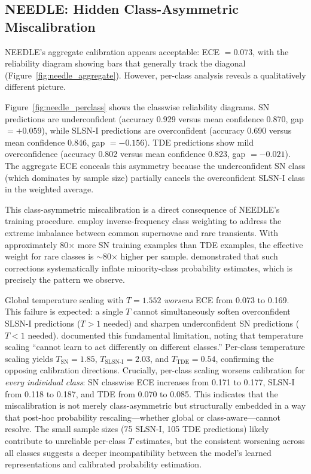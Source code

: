 \documentclass[twocolumn]{aastex631}
\begin{document}
\subsection{NEEDLE: Hidden Class-Asymmetric Miscalibration} \label{sec:needle}

NEEDLE's aggregate calibration appears acceptable: ECE $= 0.073$, with the reliability diagram showing bars that generally track the diagonal (Figure~\ref{fig:needle_aggregate}). However, per-class analysis reveals a qualitatively different picture.

Figure~\ref{fig:needle_perclass} shows the classwise reliability diagrams. SN predictions are underconfident (accuracy 0.929 versus mean confidence 0.870, gap $= +0.059$), while SLSN-I predictions are overconfident (accuracy 0.690 versus mean confidence 0.846, gap $= -0.156$). TDE predictions show mild overconfidence (accuracy 0.802 versus mean confidence 0.823, gap $= -0.021$). The aggregate ECE conceals this asymmetry because the underconfident SN class (which dominates by sample size) partially cancels the overconfident SLSN-I class in the weighted average.

This class-asymmetric miscalibration is a direct consequence of NEEDLE's training procedure. \citet{sheng2024} employ inverse-frequency class weighting to address the extreme imbalance between common supernovae and rare transients. With approximately 80$\times$ more SN training examples than TDE examples, the effective weight for rare classes is $\sim$80$\times$ higher per sample. \citet{vandengoorbergh2022} demonstrated that such corrections systematically inflate minority-class probability estimates, which is precisely the pattern we observe.

Global temperature scaling with $T = 1.552$ \emph{worsens} ECE from 0.073 to 0.169. This failure is expected: a single $T$ cannot simultaneously soften overconfident SLSN-I predictions ($T > 1$ needed) and sharpen underconfident SN predictions ($T < 1$ needed). \citet{kull2019} documented this fundamental limitation, noting that temperature scaling ``cannot learn to act differently on different classes.'' Per-class temperature scaling yields $T_{\text{SN}} = 1.85$, $T_{\text{SLSN-I}} = 2.03$, and $T_{\text{TDE}} = 0.54$, confirming the opposing calibration directions. Crucially, per-class scaling worsens calibration for \emph{every individual class}: SN classwise ECE increases from 0.171 to 0.177, SLSN-I from 0.118 to 0.187, and TDE from 0.070 to 0.085. This indicates that the miscalibration is not merely class-asymmetric but structurally embedded in a way that post-hoc probability rescaling---whether global or class-aware---cannot resolve. The small sample sizes (75 SLSN-I, 105 TDE predictions) likely contribute to unreliable per-class $T$ estimates, but the consistent worsening across all classes suggests a deeper incompatibility between the model's learned representations and calibrated probability estimation.
\end{document}
